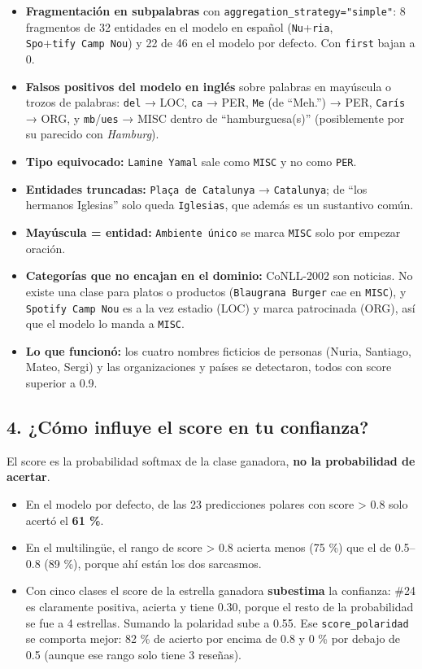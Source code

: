 \documentclass[12pt,a4paper]{article}
\begin{document}
\begin{itemize}[leftmargin=1.2em]
\item
  \textbf{Fragmentación en subpalabras} con \texttt{aggregation\_strategy="simple"}: 8 fragmentos de 32 entidades
  en el modelo en español (\texttt{Nu}+\texttt{ria}, \texttt{Spo}+\texttt{tify\ Camp\ Nou}) y 22 de 46 en el modelo por defecto.
  Con \texttt{first} bajan a 0.
\item
  \textbf{Falsos positivos del modelo en inglés} sobre palabras en mayúscula o trozos de palabras:
  \texttt{del} → LOC, \texttt{ca} → PER, \texttt{Me} (de ``Meh.'') → PER, \texttt{Carís} → ORG, y \texttt{mb}/\texttt{ues} → MISC dentro de
  ``hamburguesa(s)'' (posiblemente por su parecido con \emph{Hamburg}).
\item
  \textbf{Tipo equivocado:} \texttt{Lamine\ Yamal} sale como \texttt{MISC} y no como \texttt{PER}.
\item
  \textbf{Entidades truncadas:} \texttt{Plaça\ de\ Catalunya} → \texttt{Catalunya}; de ``los hermanos Iglesias'' solo queda
  \texttt{Iglesias}, que además es un sustantivo común.
\item
  \textbf{Mayúscula = entidad:} \texttt{Ambiente\ único} se marca \texttt{MISC} solo por empezar oración.
\item
  \textbf{Categorías que no encajan en el dominio:} CoNLL-2002 son noticias. No existe una clase para
  platos o productos (\texttt{Blaugrana\ Burger} cae en \texttt{MISC}), y \texttt{Spotify\ Camp\ Nou} es a la vez estadio
  (LOC) y marca patrocinada (ORG), así que el modelo lo manda a \texttt{MISC}.
\item
  \textbf{Lo que funcionó:} los cuatro nombres ficticios de personas (Nuria, Santiago, Mateo, Sergi) y las
  organizaciones y países se detectaron, todos con score superior a 0.9.
\end{itemize}

\subsection{4. ¿Cómo influye el score en tu confianza?}

El score es la probabilidad softmax de la clase ganadora, \textbf{no la probabilidad de acertar}.

\begin{itemize}[leftmargin=1.2em]
\item
  En el modelo por defecto, de las 23 predicciones polares con score \textgreater{} 0.8 solo acertó el \textbf{61 \%}.
\item
  En el multilingüe, el rango de score \textgreater{} 0.8 acierta menos (75 \%) que el de 0.5--0.8 (89 \%), porque
  ahí están los dos sarcasmos.
\item
  Con cinco clases el score de la estrella ganadora \textbf{subestima} la confianza: \#24 es claramente
  positiva, acierta y tiene 0.30, porque el resto de la probabilidad se fue a 4 estrellas. Sumando la
  polaridad sube a 0.55. Ese \texttt{score\_polaridad} se comporta mejor: 82 \% de acierto por encima de 0.8
  y 0 \% por debajo de 0.5 (aunque ese rango solo tiene 3 reseñas).
\end{itemize}
\end{document}
